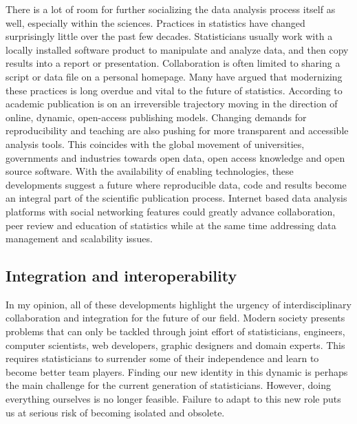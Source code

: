 There is a lot of room for further socializing the data analysis process itself as well, especially within the sciences. Practices in statistics have changed surprisingly little over the past few decades. Statisticians usually work with a locally installed software product to manipulate and analyze data, and then copy results into a report or presentation. Collaboration is often limited to sharing a script or data file on a personal homepage. Many have argued that modernizing these practices is long overdue and vital to the future of statistics. According to \cite{future2013} academic publication is on an irreversible trajectory moving in the direction of online, dynamic, open-access publishing models. Changing demands for reproducibility \citep{peng2011reproducible} and teaching \citep{nolan2010computing} are also pushing for more transparent and accessible analysis tools. This coincides with the global movement of universities, governments and industries towards open data, open access knowledge and open source software. With the availability of enabling technologies, these developments suggest a future where reproducible data, code and results become an integral part of the scientific publication process. Internet based data analysis platforms with social networking features could greatly advance collaboration, peer review and education of statistics while at the same time addressing data management and scalability issues.



\subsection{Integration and interoperability}

In my opinion, all of these developments highlight the urgency of interdisciplinary collaboration and integration for the future of our field. Modern society presents problems that can only be tackled through joint effort of statisticians, engineers, computer scientists, web developers, graphic designers and domain experts. This requires statisticians to surrender some of their independence and learn to become better team players. Finding our new identity in this dynamic is perhaps the main challenge for the current generation of statisticians. However, doing everything ourselves is no longer feasible. Failure to adapt to this new role puts us at serious risk of becoming isolated and obsolete.

